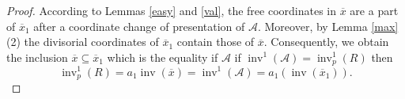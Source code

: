 \documentclass{amsart}
\newcommand{\cA}{{\mathcal A}}
\newcommand{\cO}{{\mathcal O}}
\newcommand{\ord}{{\operatorname{ord}}}
\newcommand{\inv}{{\operatorname{inv}}}
\newcommand{\inte}{{\operatorname{int}}}
\begin{document}
\begin{proof} %
 According to Lemmas  \ref{easy} and 
 \ref{val}, the free coordinates in $\overline{x}$ are a part of $\overline{x}_{1}$ after a coordinate change of presentation of $\cA$. Moreover,
 by Lemma \ref{max}(2)  the divisorial coordinates of $\overline{x}_{1}$ contain those of  $\overline{x}$. Consequently, we obtain the  inclusion $\overline{x}\subseteq \overline{x}_1$ which is the equality if $\cA$ if $\inv^1(\cA)=\inv^1_p(R)$  then $$\inv^1_p(R)=a_1\inv(\overline{x})=\inv^1(\cA)=a_1(\inv(\overline{x}_1)).$$ 
 
 \end{proof}
\end{document}
